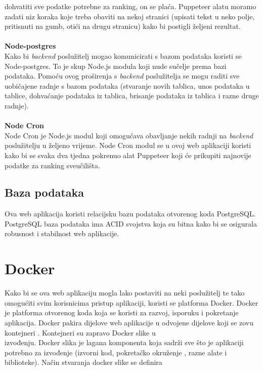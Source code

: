 \documentclass[times, utf8, zavrsni]{fer}
\begin{document}
dohvatiti sve podatke potrebne za ranking, on se plaća. Puppeteer alatu moramo zadati niz koraka koje treba obaviti na nekoj stranici (upisati tekst u neko polje, pritisnuti na gumb, otići na drugu stranicu)
kako bi postigli željeni rezultat.
\\ \\ \textbf{Node-postgres} 
\\ Kako bi \emph{backend} poslužitelj mogao komunicirati s bazom podataka koristi se Node-postgres. To je skup Node.js modula koji nude 
sučelje prema bazi podataka. Pomoću ovog proširenja s \emph{backend} poslužitelja se mogu raditi sve uobičajene radnje s bazom podataka (stvaranje novih tablica, 
unos podataka u tablice, dohvaćanje podataka iz tablica, brisanje podataka iz tablica i razne druge radnje).
\\ \\ \textbf{Node Cron}
\\ Node Cron je Node.js modul koji omogućava obavljanje nekih radnji na \emph{backend} \\poslužitelju u željeno vrijeme. Node Cron modul se u ovoj 
web aplikaciji koristi kako bi se svaka dva tjedna pokrenuo alat Puppeteer koji će prikupiti najnovije podatke za ranking sveučilišta.
\\ \subsection{Baza podataka}Ova web aplikacija koristi relacijsku bazu podataka otvorenog koda PostgreSQL. \\PostgreSQL baza podataka ima ACID 
 svojstva koja su bitna kako bi se osigurala robusnost i stabilnost web aplikacije.
\\ \section{Docker}
Kako bi se ova web aplikaciju mogla lako postaviti  na neki poslužitelj te tako omogućiti svim korisnicima pristup aplikaciji,
koristi se platforma Docker. Docker je platforma otvorenog koda koja se koristi za razvoj, isporuku i pokretanje aplikacija.
Docker pakira dijelove web aplikacije u odvojene dijelove koji se zovu kontejneri .
Kontejneri su zapravo Docker slike  u \\izvođenju. Docker slika je lagana  komponenta koja sadrži sve što je aplikaciji 
potrebno za izvođenje (izvorni kod, pokretačko okruženje , razne alate i biblioteke). Način stvaranja docker slike se definira 
\end{document}
